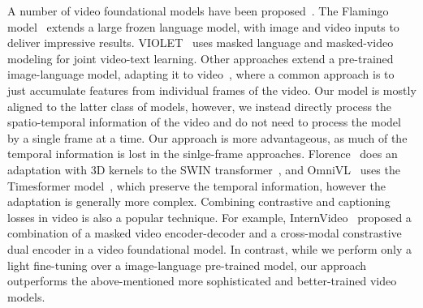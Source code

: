\documentclass[10pt]{article} \usepackage[accepted]{tmlr}
\begin{document}
A number of video foundational models have been proposed~\citep{merlot,fu2021violet,flamingo,internvideo,omniVL,VINDLU,UniVL}. The Flamingo model~\citep{flamingo} extends a large frozen language model, with image and video inputs to deliver impressive results. VIOLET~\citep{fu2021violet} uses masked language and masked-video modeling for joint video-text learning. 
 Other approaches extend a pre-trained image-language model, adapting it to video~\citep{wang2022git,videococa,dynpretr}, where a common approach is to just accumulate features from individual frames of the video.
 Our model is mostly aligned to the latter class of models, however, we instead directly process the spatio-temporal information of the video and do not need to process the model by a single frame at a time. Our approach is more advantageous, as much of the temporal information is lost in the sinlge-frame approaches. 
 Florence~\citep{yuan2021florence} does an adaptation with 3D kernels to the SWIN transformer~\citep{swin}, and OmniVL~\citep{omniVL} uses the Timesformer model~\citep{timesformer}, which preserve the temporal information, however the adaptation is generally more complex.
 Combining contrastive and captioning losses in video is also a popular technique. For example, InternVideo~\citep{internvideo} proposed a combination of a masked video encoder-decoder and a cross-modal constrastive dual encoder in a video foundational model. 
 In contrast, while we perform only a light fine-tuning over a image-language pre-trained model, our approach outperforms the above-mentioned more  sophisticated and better-trained video models. 
\end{document}
